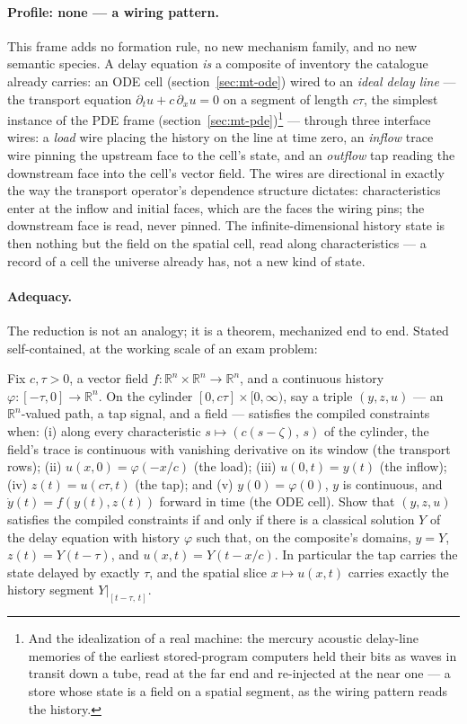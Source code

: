 \paragraph{Profile: none --- a wiring pattern.} This frame adds no
formation rule, no new mechanism family, and no new semantic species.
A delay equation \emph{is} a composite of inventory the catalogue
already carries: an ODE cell (section~\ref{sec:mt-ode}) wired to an
\emph{ideal delay line} --- the transport equation $\partial_t u + c\,
\partial_x u = 0$ on a segment of length $c\tau$, the simplest
instance of the PDE frame
(section~\ref{sec:mt-pde})\footnote{And the idealization of a real
machine: the mercury acoustic delay-line memories of the earliest
stored-program computers held their bits as waves in transit down a
tube, read at the far end and re-injected at the near one --- a
store whose state is a field on a spatial segment, as the wiring
pattern reads the history.} ---
through three interface wires:
a \emph{load} wire placing the history on the line at time zero, an
\emph{inflow} trace wire pinning the upstream face to the cell's
state, and an \emph{outflow} tap reading the downstream face into the
cell's vector field.  The wires are directional in exactly the way
the transport operator's dependence structure dictates:
characteristics enter at the inflow and initial faces, which are the
faces the wiring pins; the downstream face is read, never pinned.
The infinite-dimensional history state is then nothing but the field
on the spatial cell, read along characteristics --- a record of a
cell the universe already has, not a new kind of state.

\paragraph{Adequacy.} The reduction is not an analogy; it is a
theorem, mechanized end to end.  Stated self-contained, at the
working scale of an exam problem:

\begin{problem}
\label{prob:mt-dde}
Fix $c, \tau > 0$, a vector field $f : \mathbb{R}^n
\times \mathbb{R}^n \to \mathbb{R}^n$, and a continuous history
$\varphi : [-\tau, 0] \to \mathbb{R}^n$.  On the cylinder $[0, c\tau]
\times [0, \infty)$, say a triple $(y, z, u)$ --- an
$\mathbb{R}^n$-valued path, a tap signal, and a field --- satisfies
the compiled constraints when: (i) along every characteristic
$s \mapsto (c(s - \zeta),\, s)$ of the cylinder, the field's trace is
continuous with vanishing derivative on its window (the transport
rows); (ii) $u(x, 0) = \varphi(-x/c)$ (the load); (iii) $u(0, t) =
y(t)$ (the inflow); (iv) $z(t) = u(c\tau, t)$ (the tap); and (v)
$y(0) = \varphi(0)$, $y$ is continuous, and $\dot y(t) = f(y(t),
z(t))$ forward in time (the ODE cell).  Show that $(y, z, u)$
satisfies the compiled constraints if and only if there is a
classical solution $Y$ of the delay equation with history $\varphi$
such that, on the composite's domains, $y = Y$, $z(t) = Y(t - \tau)$,
and $u(x, t) = Y(t - x/c)$.  In particular the tap carries the state
delayed by exactly $\tau$, and the spatial slice $x \mapsto u(x, t)$
carries exactly the history segment $Y|_{[t-\tau,\,t]}$.
\end{problem}

